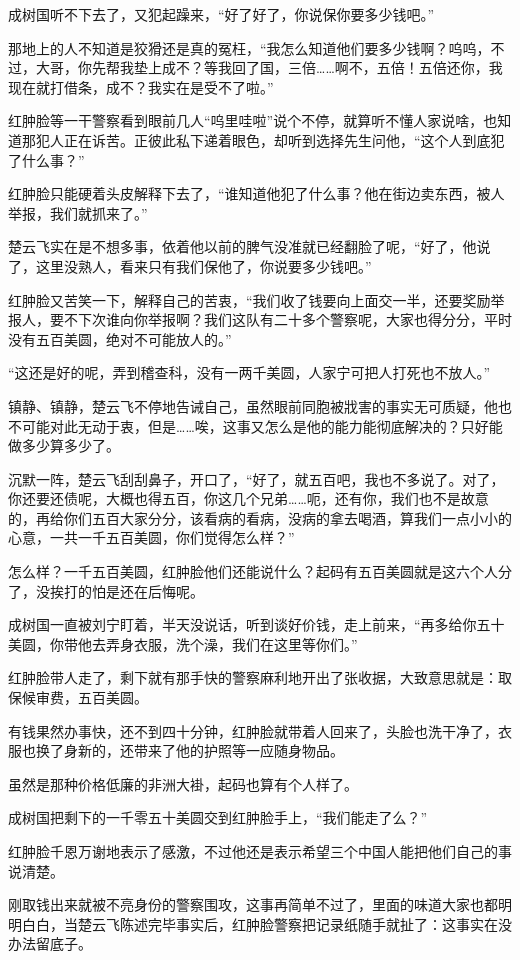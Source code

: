 成树国听不下去了，又犯起躁来，“好了好了，你说保你要多少钱吧。”

那地上的人不知道是狡猾还是真的冤枉，“我怎么知道他们要多少钱啊？呜呜，不过，大哥，你先帮我垫上成不？等我回了国，三倍……啊不，五倍！五倍还你，我现在就打借条，成不？我实在是受不了啦。”

红肿脸等一干警察看到眼前几人“呜里哇啦”说个不停，就算听不懂人家说啥，也知道那犯人正在诉苦。正彼此私下递着眼色，却听到选择先生问他，“这个人到底犯了什么事？”

红肿脸只能硬着头皮解释下去了，“谁知道他犯了什么事？他在街边卖东西，被人举报，我们就抓来了。”

楚云飞实在是不想多事，依着他以前的脾气没准就已经翻脸了呢，“好了，他说了，这里没熟人，看来只有我们保他了，你说要多少钱吧。”

红肿脸又苦笑一下，解释自己的苦衷，“我们收了钱要向上面交一半，还要奖励举报人，要不下次谁向你举报啊？我们这队有二十多个警察呢，大家也得分分，平时没有五百美圆，绝对不可能放人的。”

“这还是好的呢，弄到稽查科，没有一两千美圆，人家宁可把人打死也不放人。”

镇静、镇静，楚云飞不停地告诫自己，虽然眼前同胞被戕害的事实无可质疑，他也不可能对此无动于衷，但是……唉，这事又怎么是他的能力能彻底解决的？只好能做多少算多少了。

沉默一阵，楚云飞刮刮鼻子，开口了，“好了，就五百吧，我也不多说了。对了，你还要还债呢，大概也得五百，你这几个兄弟……呃，还有你，我们也不是故意的，再给你们五百大家分分，该看病的看病，没病的拿去喝酒，算我们一点小小的心意，一共一千五百美圆，你们觉得怎么样？”

怎么样？一千五百美圆，红肿脸他们还能说什么？起码有五百美圆就是这六个人分了，没挨打的怕是还在后悔呢。

成树国一直被刘宁盯着，半天没说话，听到谈好价钱，走上前来，“再多给你五十美圆，你带他去弄身衣服，洗个澡，我们在这里等你们。”

红肿脸带人走了，剩下就有那手快的警察麻利地开出了张收据，大致意思就是：取保候审费，五百美圆。

有钱果然办事快，还不到四十分钟，红肿脸就带着人回来了，头脸也洗干净了，衣服也换了身新的，还带来了他的护照等一应随身物品。

虽然是那种价格低廉的非洲大褂，起码也算有个人样了。

成树国把剩下的一千零五十美圆交到红肿脸手上，“我们能走了么？”

红肿脸千恩万谢地表示了感激，不过他还是表示希望三个中国人能把他们自己的事说清楚。

刚取钱出来就被不亮身份的警察围攻，这事再简单不过了，里面的味道大家也都明明白白，当楚云飞陈述完毕事实后，红肿脸警察把记录纸随手就扯了：这事实在没办法留底子。

